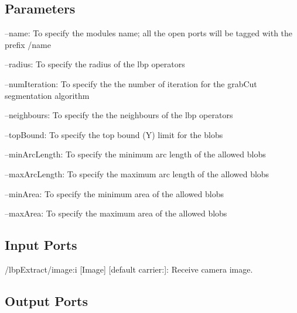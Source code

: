  \hypertarget{group__lbpExtract_parameters_sec}{}\subsection{Parameters}\label{group__lbpExtract_parameters_sec}

\begin{DoxyItemize}
\item --name\+: To specify the module\textquotesingle{}s name; all the open ports will be tagged with the prefix /name
\item --radius\+: To specify the radius of the lbp operators
\item --num\+Iteration\+: To specify the the number of iteration for the grab\+Cut segmentation algorithm
\item --neighbours\+: To specify the the neighbours of the lbp operators
\item --top\+Bound\+: To specify the top bound (Y) limit for the blobs
\item --min\+Arc\+Length\+: To specify the minimum arc length of the allowed blobs
\item --max\+Arc\+Length\+: To specify the maximum arc length of the allowed blobs
\item --min\+Area\+: To specify the minimum area of the allowed blobs
\item --max\+Area\+: To specify the maximum area of the allowed blobs 
\end{DoxyItemize}\hypertarget{group__lbpExtract_inputports_sec}{}\subsection{Input Ports}\label{group__lbpExtract_inputports_sec}

\begin{DoxyItemize}
\item /lbp\+Extract/image\+:i \mbox{[}Image\mbox{]} \mbox{[}default carrier\+:\mbox{]}\+: Receive camera image.
\end{DoxyItemize}\hypertarget{group__lbpExtract_outputports_sec}{}\subsection{Output Ports}\label{group__lbpExtract_outputports_sec}

